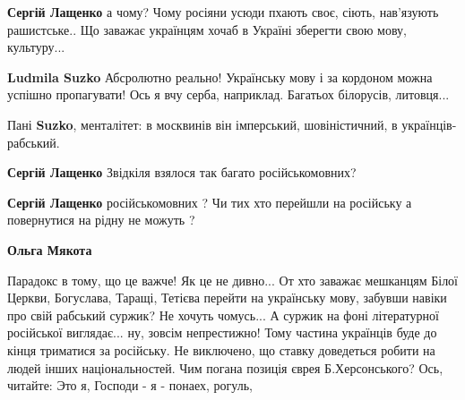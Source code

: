 \begin{itemize}
\begin{itemize}
\textbf{Сергій Лащенко} а чому? Чому росіяни усюди пхають своє, сіють, нав'язують рашистське.. Що заважає українцям хочаб в Україні зберегти свою мову, культуру...

 
\textbf{Ludmila Suzko} Абсролютно реально! Українську мову і за кордоном можна успішно пропагувати! Ось я вчу серба, наприклад. Багатьох білорусів, литовця...

 
Пані \textbf{Suzko}, менталітет: в москвинів він імперський, шовіністичний, в українців- рабський.

 
\textbf{Сергій Лащенко} Звідкіля взялося так багато російськомовних?

 
\textbf{Сергій Лащенко} російськомовних ? Чи тих хто перейшли на російську а повернутися на рідну не можуть ?

 
\textbf{Ольга Мякота} 

Парадокс в тому, що це важче! Як це не дивно... От хто заважає мешканцям Білої
Церкви, Богуслава, Таращі, Тетієва перейти на українську мову, забувши навіки
про свій рабський суржик? Не хочуть чомусь... А суржик на фоні літературної
російської виглядає... ну, зовсім непрестижно! Тому частина українців буде до
кінця триматися за російську. Не виключено, що ставку доведеться робити на
людей інших національностей. Чим погана позиція єврея Б.Херсонського? Ось,
читайте: Это я, Господи - я - понаех, рогуль,


\end{itemize}
\end{itemize}
